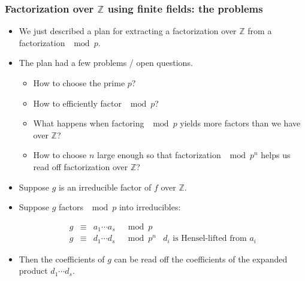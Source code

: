 \begin{frame}
\frametitle{Factorization over $\mathbb Z$ using finite fields: the problems}
\begin{itemize}
\item We just described a plan for extracting a factorization over $\mathbb Z$ from a factorization $\mod p$.
\item The plan had a few problems / open questions.
\begin{itemize}
\item How to choose the prime $p$?
\item How to efficiently factor $\mod p$? 
\item \alert<1->{What happens when factoring $\mod p$ yields more factors than we have over $\mathbb Z$?}
\item How to choose $n$ large enough so that factorization $\mod p^n$ helps us read off factorization over $\mathbb Z$?
\end{itemize}
\end{itemize}
\end{frame}

\begin{frame}
\begin{itemize}
\item Suppose $g$ is an irreducible factor of $f$ over $\mathbb Z$.
\item<2-> Suppose $g$ factors $\mod p$ into irreducibles: 
	
\[
\begin{array}{rcll|l}
g&\equiv& a_1\cdots a_s & \mod p  \\
g&\equiv& d_1\cdots d_s & \mod p^n &d_i \text{ is Hensel-lifted from } a_i
\end{array}
\]
\item<3-> Then the coefficients of $g$ can be read off the coefficients of the expanded product $d_1\cdots d_s$.
\end{itemize}
\end{frame}

